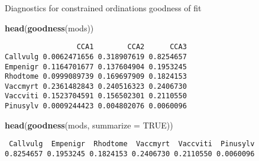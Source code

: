 \documentclass[10pt,ignorenonframetext,compress, aspectratio=169]{beamer}
\newenvironment{Shaded}{\begin{snugshade}}{\end{snugshade}}
\newcommand{\KeywordTok}[1]{\textcolor[rgb]{0.13,0.29,0.53}{\textbf{{#1}}}}
\newcommand{\DataTypeTok}[1]{\textcolor[rgb]{0.13,0.29,0.53}{{#1}}}
\newcommand{\OtherTok}[1]{\textcolor[rgb]{0.56,0.35,0.01}{{#1}}}
\newcommand{\NormalTok}[1]{{#1}}
\begin{document}
\begin{frame}[fragile]{Diagnostics for constrained ordinations
\textbar{} goodness of fit}

\scriptsize

\begin{Shaded}
\begin{Highlighting}[]
\KeywordTok{head}\NormalTok{(}\KeywordTok{goodness}\NormalTok{(mods))}
\end{Highlighting}
\end{Shaded}

\begin{verbatim}
                 CCA1        CCA2      CCA3
Callvulg 0.0062471656 0.318907619 0.8254657
Empenigr 0.1164701677 0.137604904 0.1953245
Rhodtome 0.0999089739 0.169697909 0.1824153
Vaccmyrt 0.2361482843 0.240516323 0.2406730
Vaccviti 0.1523704591 0.156502301 0.2110550
Pinusylv 0.0009244423 0.004802076 0.0060096
\end{verbatim}

\begin{Shaded}
\begin{Highlighting}[]
\KeywordTok{head}\NormalTok{(}\KeywordTok{goodness}\NormalTok{(mods, }\DataTypeTok{summarize =} \OtherTok{TRUE}\NormalTok{))}
\end{Highlighting}
\end{Shaded}

\begin{verbatim}
 Callvulg  Empenigr  Rhodtome  Vaccmyrt  Vaccviti  Pinusylv 
0.8254657 0.1953245 0.1824153 0.2406730 0.2110550 0.0060096 
\end{verbatim}

\normalsize

\end{frame}
\end{document}
